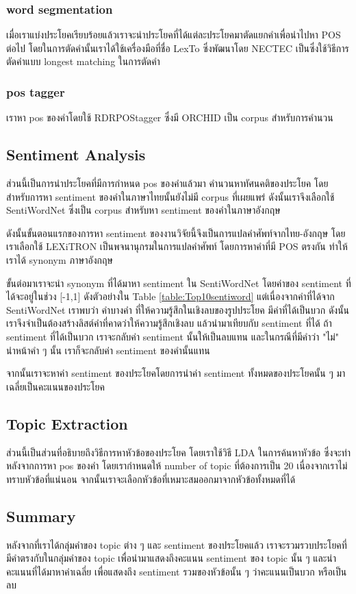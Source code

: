 \subsubsection{word segmentation}
เมื่อเราแบ่งประโยคเรียบร้อยแล้วเราจะนำประโยคที่ได้แต่ละประโยคมาตัดแยกคำเพื่อนำไปหา POS ต่อไป โดยในการตัดคำนั้นเราได้ใช้เครื่องมือที่ชื่อ LexTo ซึ่งพัฒนาโดย NECTEC เป็นซึ่งใช้วิธีการตัดคำแบบ longest matching 
ในการตัดคำ
\subsubsection{pos tagger}
เราหา pos ของคำโดยใช้ RDRPOStagger ซึ่งมี ORCHID เป็น corpus สำหรับการคำนวน
\subsection{Sentiment Analysis}
ส่วนนี้เป็นการนำประโยคที่มีการกำหนด pos ของคำแล้วมา คำนวนหาทัศนคติของประโยค โดยสำหรับการหา sentiment ของคำในภาษาไทยนั้นยังไม่มี corpus ที่เผยแพร่ ดังนั้นเราจึงเลือกใช้ SentiWordNet \cite{SentiWordNet} ซึ่งเป็น corpus สำหรับหา sentiment ของคำในภาษาอังกฤษ 

ดังนั้นขั้นตอนแรกของการหา sentiment ของงานวิจัยนี้จึงเป็นการแปลคำศัพท์จากไทย-อังกฤษ โดยเราเลือกใช้ LEXiTRON \cite{LEXiTRON} เป็นพจนานุกรมในการแปลคำศัพท์ โดยการหาคำที่มี POS ตรงกัน ทำให้เราได้ synonym ภาษาอังกฤษ

ขั้นต่อมาเราจะนำ synonym ที่ได้มาหา sentiment ใน SentiWordNet โดยค่าของ sentiment ที่ได้จะอยู่ในช่วง [-1,1] ดังตัวอย่างใน Table \ref{table:Top10sentiword}
แต่เนื่องจากค่าที่ได้จาก SentiWordNet เราพบว่า คำบางคำ ที่ให้ความรู้สึกในเชิงลบของรูปประโยค มีค่าที่ได้เป็นบวก ดังนั้นเราจึงจำเป็นต้องสร้างลิสต์คำที่คาดว่าให้ความรู้สึกเชิงลบ แล้วนำมาเทียบกับ sentiment ที่ได้ ถ้า sentiment ที่ได้เป็นบวก เราจะกลับค่า sentiment นั้นให้เป็นลบแทน และในกรณีที่มีคำว่า "ไม่" นำหน้าคำ ๆ นั้น เราก็จะกลับค่า sentiment ของคำนั้นแทน

จากนั้นเราจะหาค่า sentiment ของประโยคโดยการนำค่า sentiment ทั้งหมดของประโยคนั้น ๆ มาเฉลี่ยเป็นคะแนนของประโยค
\subsection{Topic Extraction}
ส่วนนี้เป็นส่วนที่อธิบายถึงวิธีการหาหัวข้อของประโยค โดยเราใช้วิธี LDA ในการค้นหาหัวข้อ ซึ่งจะทำหลังจากการหา pos ของคำ
โดยเรากำหนดให้ number of topic ที่ต้องการเป็น 20 เนื่องจากเราไม่ทราบหัวข้อที่แน่นอน จากนั้นเราจะเลือกหัวข้อที่เหมาะสมออกมาจากหัวข้อทั้งหมดที่ได้
\subsection{Summary}
หลังจากที่เราได้กลุ่มคำของ topic ต่าง ๆ และ sentiment ของประโยคแล้ว เราจะรวมรวบประโยคที่มีคำตรงกับในกลุ่มคำของ topic เพื่อนำมาแสดงถึงคะแนน sentiment ของ topic นั้น ๆ และนำคะแนนที่ได้มาหาค่าเฉลี่ย เพื่อแสดงถึง sentiment รวมของหัวข้อนั้น ๆ ว่าคะแนนเป็นบวก หรือเป็นลบ

